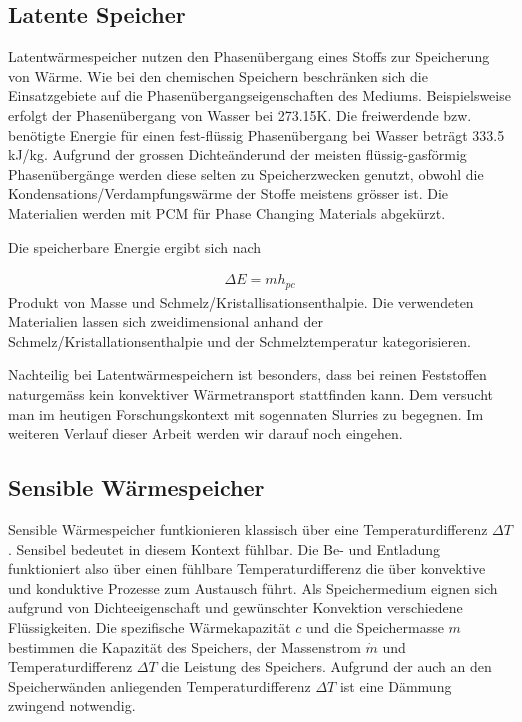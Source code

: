 \documentclass[11pt,a4paper]{scrartcl}
\begin{document}
\subsection{Latente Speicher}
Latentwärmespeicher nutzen den Phasenübergang eines Stoffs zur Speicherung von
Wärme. Wie bei den chemischen Speichern beschränken sich die Einsatzgebiete auf
die Phasenübergangseigenschaften des Mediums. Beispielsweise erfolgt der
Phasenübergang von Wasser bei 273.15K. Die freiwerdende bzw. benötigte Energie
für einen fest-flüssig Phasenübergang bei Wasser beträgt 333.5 kJ/kg.
Aufgrund der grossen Dichteänderund der meisten flüssig-gasförmig
Phasenübergänge werden diese selten zu Speicherzwecken genutzt, obwohl die
Kondensations/Verdampfungswärme der Stoffe meistens grösser ist. Die Materialien
werden mit PCM für \flqq Phase Changing Materials\frqq{} abgekürzt.

Die speicherbare Energie ergibt sich nach

\begin{align}
\Delta E = mh_{pc}
\end{align}
Produkt von Masse und Schmelz/Kristallisationsenthalpie. Die verwendeten
Materialien lassen sich zweidimensional anhand der
Schmelz/Kristallationsenthalpie und der Schmelztemperatur kategorisieren. 

Nachteilig bei Latentwärmespeichern ist besonders, dass bei reinen Feststoffen
naturgemäss kein konvektiver Wärmetransport stattfinden kann. Dem versucht man
im heutigen Forschungskontext mit sogennaten Slurries zu begegnen. Im weiteren
Verlauf dieser Arbeit werden wir darauf noch eingehen. \cite{Wesselak}

\subsection{Sensible Wärmespeicher}

Sensible Wärmespeicher funtkionieren klassisch über eine Temperaturdifferenz
$\Delta T$. Sensibel bedeutet in diesem Kontext \flqq fühlbar\frqq{}. Die
Be- und Entladung funktioniert also über einen \flqq fühlbare\frqq{}
Temperaturdifferenz die über konvektive und konduktive Prozesse zum Austausch
führt. Als Speichermedium eignen sich aufgrund von Dichteeigenschaft und
gewünschter Konvektion verschiedene Flüssigkeiten. Die spezifische
Wärmekapazität $c$ und die Speichermasse $m$ bestimmen die Kapazität des
Speichers, der Massenstrom $\dot{m}$ und Temperaturdifferenz $\Delta T$ die
Leistung des Speichers. Aufgrund der auch an den Speicherwänden anliegenden
Temperaturdifferenz $\Delta T$ ist eine Dämmung zwingend notwendig. 
\end{document}
